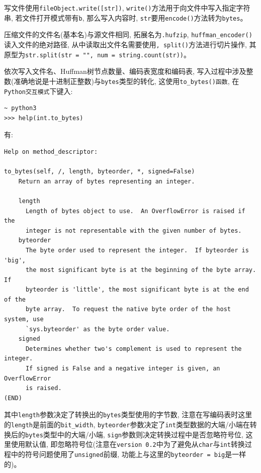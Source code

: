 \documentclass{ctexart}
\begin{document}
写文件使用\texttt{fileObject.write({[}str{]})}, \texttt{write()}方法用于向文件中写入指定字符串, 若文件打开模式带有\texttt{\textquotesingle{}b\textquotesingle{}}, 那么写入内容时, \texttt{str}要用\texttt{encode()}方法转为\texttt{bytes}。

压缩文件的文件名(基本名)与源文件相同, 拓展名为\texttt{.hufzip}, \texttt{huffman\_encoder()}读入文件的绝对路径, 从中读取出文件名需要使用\texttt{,\ split()}方法进行切片操作, 其原型为\texttt{str.split(str\ =\ "",\ num\ =\ string.count(str))}。

依次写入文件名、Huffman树节点数量、编码表宽度和编码表, 写入过程中涉及整数(准确地说是十进制正整数)与\texttt{bytes}类型的转化, 这使用\texttt{to\_bytes()函数}, 在\texttt{Python交互模式}下键入:

{\setmainfont{Courier New Bold}              
\begin{lstlisting}
~ python3
>>> help(int.to_bytes)
\end{lstlisting}}

有:

{\setmainfont{Courier New Bold}              
\begin{lstlisting}
Help on method_descriptor:

to_bytes(self, /, length, byteorder, *, signed=False)
    Return an array of bytes representing an integer.

    length
      Length of bytes object to use.  An OverflowError is raised if the
      integer is not representable with the given number of bytes.
    byteorder
      The byte order used to represent the integer.  If byteorder is 'big',
      the most significant byte is at the beginning of the byte array.  If
      byteorder is 'little', the most significant byte is at the end of the
      byte array.  To request the native byte order of the host system, use
      `sys.byteorder' as the byte order value.
    signed
      Determines whether two's complement is used to represent the integer.
      If signed is False and a negative integer is given, an OverflowError
      is raised.
(END)
\end{lstlisting}}

其中\texttt{length}参数决定了转换出的\texttt{bytes}类型使用的字节数, 注意在写编码表时这里的\texttt{length}是前面的\texttt{bit\_width}, \texttt{byteorder}参数决定了\texttt{int}类型数据的大端/小端在转换后的\texttt{bytes}类型中的大端/小端, \texttt{sign}参数则决定转换过程中是否忽略符号位, 这里使用默认值, 即忽略符号位(注意在\texttt{version\ 0.2}中为了避免从\texttt{char}与\texttt{int}转换过程中的符号问题使用了\texttt{unsigned}前缀, 功能上与这里的\texttt{byteorder\ =\ \textquotesingle{}big\textquotesingle{}}是一样的)。
\end{document}
